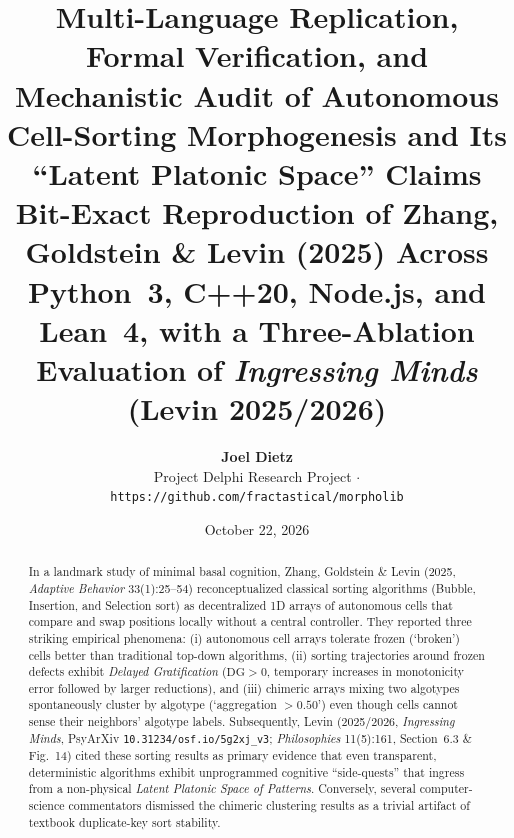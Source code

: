 \documentclass[11pt,a4paper]{article}
\title{\textbf{Multi-Language Replication, Formal Verification, and Mechanistic Audit of Autonomous Cell-Sorting Morphogenesis and Its ``Latent Platonic Space'' Claims}\\[0.55em]
\large Bit-Exact Reproduction of Zhang, Goldstein \& Levin (2025) Across Python~3, C++20, Node.js, and Lean~4, with a Three-Ablation Evaluation of \emph{Ingressing Minds} (Levin 2025/2026)}
\author{
  \textbf{Joel Dietz}\\
  Project Delphi Research Project $\cdot$ \texttt{https://github.com/fractastical/morpholib}
}
\date{October 22, 2026}
\theoremstyle{definition}
\theoremstyle{remark}
\newcommand{\DG}{\mathrm{DG}}
\begin{document}
\maketitle

\begin{abstract}
In a landmark study of minimal basal cognition, Zhang, Goldstein \& Levin (2025, \emph{Adaptive Behavior} 33(1):25--54) reconceptualized classical sorting algorithms (Bubble, Insertion, and Selection sort) as decentralized 1D arrays of autonomous cells that compare and swap positions locally without a central controller. They reported three striking empirical phenomena: (i) autonomous cell arrays tolerate frozen (`broken') cells better than traditional top-down algorithms, (ii) sorting trajectories around frozen defects exhibit \emph{Delayed Gratification} ($\DG > 0$, temporary increases in monotonicity error followed by larger reductions), and (iii) chimeric arrays mixing two algotypes spontaneously cluster by algotype (`aggregation $> 0.50$') even though cells cannot sense their neighbors' algotype labels. Subsequently, Levin (2025/2026, \emph{Ingressing Minds}, PsyArXiv \texttt{10.31234/osf.io/5g2xj\_v3}; \emph{Philosophies} 11(5):161, Section~6.3 \& Fig.~14) cited these sorting results as primary evidence that even transparent, deterministic algorithms exhibit unprogrammed cognitive ``side-quests'' that ingress from a non-physical \emph{Latent Platonic Space of Patterns}. Conversely, several computer-science commentators dismissed the chimeric clustering results as a trivial artifact of textbook duplicate-key sort stability.


\end{abstract}
\end{document}
